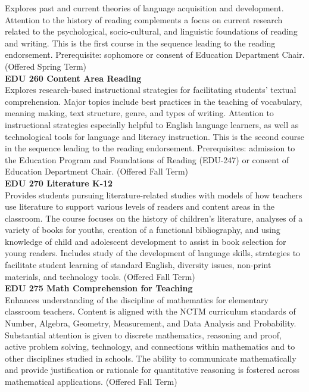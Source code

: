 \documentclass[
  letterpaper,
]{scrbook}
\begin{document}
Explores past and current theories of language acquisition and
development. Attention to the history of reading complements a focus on
current research related to the psychological, socio-cultural, and
linguistic foundations of reading and writing. This is the first course
in the sequence leading to the reading endorsement. Prerequisite:
sophomore or consent of Education Department Chair. (Offered Spring
Term)\\
\textbf{EDU 260 Content Area Reading}\\
Explores research-based instructional strategies for facilitating
students' textual comprehension. Major topics include best practices in
the teaching of vocabulary, meaning making, text structure, genre, and
types of writing. Attention to instructional strategies especially
helpful to English language learners, as well as technological tools for
language and literacy instruction. This is the second course in the
sequence leading to the reading endorsement. Prerequisites: admission to
the Education Program and Foundations of Reading (EDU-247) or consent of
Education Department Chair. (Offered Fall Term)\\
\textbf{EDU 270 Literature K-12}\\
Provides students pursuing literature-related studies with models of how
teachers use literature to support various levels of readers and content
areas in the classroom. The course focuses on the history of children's
literature, analyses of a variety of books for youths, creation of a
functional bibliography, and using knowledge of child and adolescent
development to assist in book selection for young readers. Includes
study of the development of language skills, strategies to facilitate
student learning of standard English, diversity issues, non-print
materials, and technology tools. (Offered Fall Term)\\
\textbf{EDU 275 Math Comprehension for Teaching}\\
Enhances understanding of the discipline of mathematics for elementary
classroom teachers. Content is aligned with the NCTM curriculum
standards of Number, Algebra, Geometry, Measurement, and Data Analysis
and Probability. Substantial attention is given to discrete mathematics,
reasoning and proof, active problem solving, technology, and connections
within mathematics and to other disciplines studied in schools. The
ability to communicate mathematically and provide justification or
rationale for quantitative reasoning is fostered across mathematical
applications. (Offered Fall Term)\\
\end{document}

